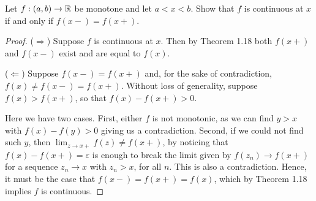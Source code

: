 \begin{exercise}{49}
Let $f:(a,b)\to\mathbb{R}$ be monotone and let $a<x<b$. Show that $f$ is continuous at $x$ if and only if $f(x-)=f(x+)$.
\end{exercise}
\begin{proof}
($\Rightarrow$) Suppose $f$ is continuous at $x$. Then by Theorem 1.18 both $f(x+)$ and $f(x-)$ exist and are equal to $f(x)$.

($\Leftarrow$) Suppose $f(x-)=f(x+)$ and, for the sake of contradiction, $f(x)\neq f(x-)=f(x+)$. Without loss of generality, suppose $f(x)>f(x+)$, so that $f(x)-f(x+) >0$. 

Here we have two cases. First, either $f$ is not monotonic, as we can find $y>x$ with $f(x)-f(y) >0$ giving us a contradiction. Second, if we could not find such $y$, then $\lim_{z\to x+}f(z) \neq f(x+)$, by noticing that $f(x)-f(x+) =\varepsilon$ is enough to break the limit given by $f(z_n)\to f(x+)$ for a sequence $z_n\to x$ with $z_n>x$, for all $n$. This is also a contradiction. Hence, it must be the case that $f(x-)=f(x+)=f(x)$, which by Theorem 1.18 implies $f$ is continuous.
\end{proof}